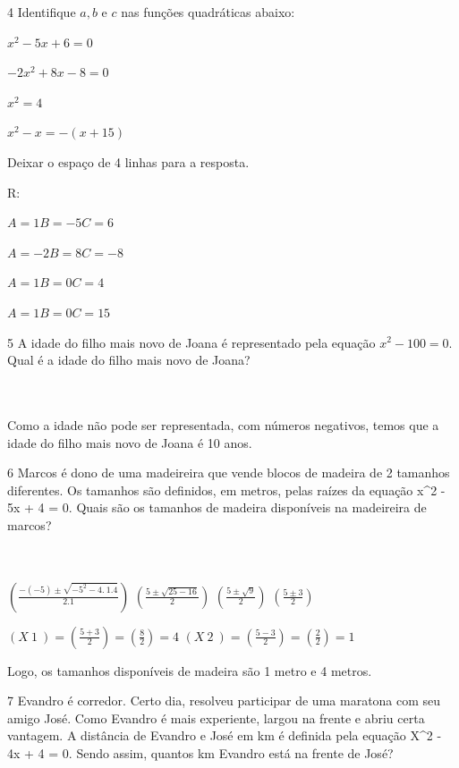 \num{4} Identifique $a, b$ e $c$ nas funções quadráticas abaixo:
\item $x^2 - 5x + 6 = 0$
\item $-2x^2 + 8x - 8 = 0$
\item $x^2 = 4$
\item $x^2 - x = - (x + 15)$

Deixar o espaço de 4 linhas para a resposta.

R:
\item
$A = 1
B = -5
C = 6$
\item
$A = -2
B = 8
C = -8$
\item
$A = 1
B = 0
C = 4$
\item
$A = 1
B = 0
C = 15$

\num{5} A idade do filho mais novo de Joana é representado pela equação $x^2 -
100 = 0$. Qual é a idade do filho mais novo de Joana?

\\
\\

Como a idade não pode ser representada, com números negativos, temos que
a idade do filho mais novo de Joana é 10 anos.

\num{6} Marcos é dono de uma madeireira que vende blocos de madeira de 2
tamanhos diferentes. Os tamanhos são definidos, em metros, pelas raízes
da equação x^2 - 5x + 4 = 0. Quais são os tamanhos de madeira disponíveis
na madeireira de marcos?

\\
\\

$(\frac{- ( - 5) \pm \sqrt{{- 5}^{2} - 4.\ 1.4}}{2.1})$
$(\frac{5 \pm \sqrt{25 - 16}}{2})$
$(\frac{5 \pm \sqrt{9}}{2})$
$(\frac{5 \pm 3}{2})$

$(X~1~) = (\frac{5 + 3}{2})= (\frac{8}{2}) = 4$
$(X~2~) = (\frac{5 - 3}{2})= (\frac{2}{2})=1$

Logo, os tamanhos disponíveis de madeira são 1 metro e 4 metros.

\num{7} Evandro é corredor. Certo dia, resolveu participar de uma maratona
com seu amigo José. Como Evandro é mais experiente, largou na frente e
abriu certa vantagem. A distância de Evandro e José em km é definida
pela equação X^2 - 4x + 4 = 0. Sendo assim, quantos km Evandro está na
frente de José?

